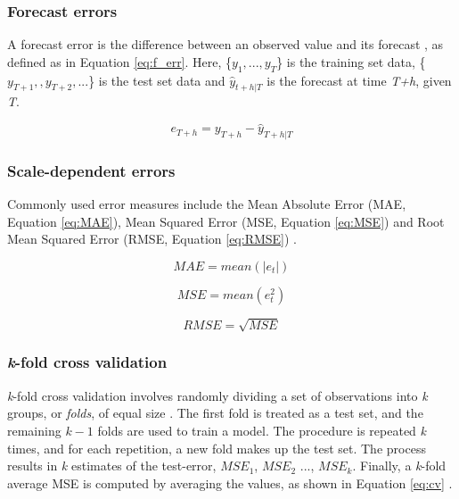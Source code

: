 \subsubsection{Forecast errors}
A forecast error is the difference between an observed value and its forecast \citep{Hyndman}, as defined as in Equation \ref{eq:f_err}. Here, \{$ y_{1},...,y_{T} $\} is the training set data, \{$ y_{T+1},,y_{T+2},...$\} is the test set data and $\hat{y}_{t+h|T}$ is the forecast at time \textit{T+h}, given \textit{T}. 

\begin{equation}\label{eq:f_err}
    e_{T+h} = y_{T+h} - \hat{y}_{T+h|T}
\end{equation}

\subsubsection{Scale-dependent errors}

Commonly used error measures include the Mean Absolute Error (MAE, Equation \ref{eq:MAE}), Mean Squared Error (MSE, Equation \ref{eq:MSE}) and Root Mean Squared Error (RMSE, Equation \ref{eq:RMSE}) \citep{Hyndman}.

\begin{equation}\label{eq:MAE}
    MAE = mean(|e_t|)
\end{equation}

\begin{equation}\label{eq:MSE}
    MSE = mean(e_t^2)
\end{equation}

\begin{equation}\label{eq:RMSE}
    RMSE = \sqrt{MSE}
\end{equation}


\subsubsection{\textit{k}-fold cross validation}
\textit{k}-fold cross validation involves randomly dividing a set of observations into \textit{k} groups, or \textit{folds}, of equal size \citep{ISLR}. The first fold is treated as a test set, and the remaining $k-1$ folds are used to train a model. The procedure is repeated \textit{k} times, and for each repetition, a new fold makes up the test set. The process results in \textit{k} estimates of the test-error, $MSE_1$, $MSE_2$ ..., $MSE_k$. Finally, a \textit{k}-fold average MSE is computed by averaging the values, as shown in Equation \ref{eq:cv} \citep{ISLR}.

